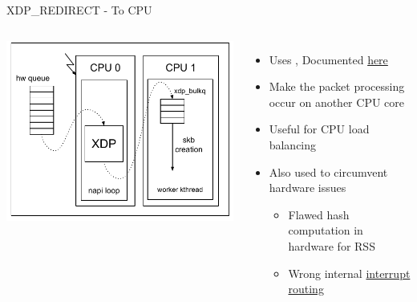 \begin{frame}{XDP\_REDIRECT - To CPU}
	\begin{columns}
		\includegraphics[width=\textwidth]{slides/networking-ebpf-xdp/xdp_redirect_cpumap.pdf}
	\begin{itemize}
		\item Uses , Documented \href{https://docs.kernel.org/bpf/map_cpumap.html}{here}
		\item Make the packet processing occur on another CPU core
		\item Useful for CPU load balancing
		\item Also used to circumvent hardware issues
			\begin{itemize}
				\item Flawed hash computation in hardware for RSS
				\item Wrong internal \href{https://elixir.bootlin.com/linux/v6.15.1/source/drivers/net/ethernet/marvell/mvneta.c\#L4424}{interrupt routing}
			\end{itemize}
	\end{itemize}
	\end{columns}
\end{frame}

